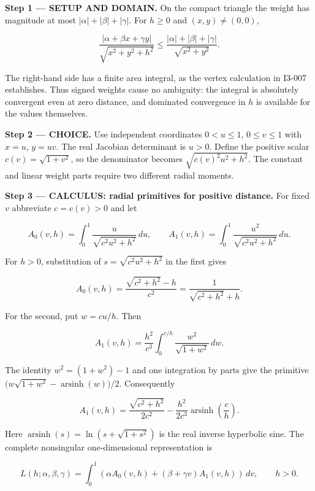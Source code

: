 \documentclass[11pt,oneside,openany]{book}
\begin{document}
\begin{DomainStep}
\textbf{Step 1 --- SETUP AND DOMAIN.} On the compact triangle the weight has magnitude at most \(|\alpha|+|\beta|+|\gamma|\). For \(h\ge0\) and \((x,y)\ne(0,0)\),

\[
\frac{|\alpha+\beta x+\gamma y|}{\sqrt{x^2+y^2+h^2}}
\le\frac{|\alpha|+|\beta|+|\gamma|}{\sqrt{x^2+y^2}}.
\]

The right-hand side has a finite area integral, as the vertex calculation in I3-007 establishes. Thus signed weights cause no ambiguity: the integral is absolutely convergent even at zero distance, and dominated convergence in \(h\) is available for the values themselves.

\end{DomainStep}
\begin{ChoiceStep}
\textbf{Step 2 --- CHOICE.} Use independent coordinates \(0<u\le1\), \(0\le v\le1\) with \(x=u\), \(y=uv\). The real Jacobian determinant is \(u>0\). Define the positive scalar \(c(v)=\sqrt{1+v^2}\), so the denominator becomes \(\sqrt{c(v)^2u^2+h^2}\). The constant and linear weight parts require two different radial moments.

\end{ChoiceStep}
\textbf{Step 3 --- CALCULUS: radial primitives for positive distance.} For fixed \(v\) abbreviate \(c=c(v)>0\) and let

\[
A_0(v,h)=\int_0^1\frac{u}{\sqrt{c^2u^2+h^2}}\,du,
\qquad
A_1(v,h)=\int_0^1\frac{u^2}{\sqrt{c^2u^2+h^2}}\,du.
\]

For \(h>0\), substitution of \(s=\sqrt{c^2u^2+h^2}\) in the first gives

\[
A_0(v,h)=\frac{\sqrt{c^2+h^2}-h}{c^2}
=\frac1{\sqrt{c^2+h^2}+h}.
\]

For the second, put \(w=cu/h\). Then

\[
A_1(v,h)=\frac{h^2}{c^3}\int_0^{c/h}\frac{w^2}{\sqrt{1+w^2}}\,dw.
\]

The identity \(w^2=(1+w^2)-1\) and one integration by parts give the primitive
\(\bigl(w\sqrt{1+w^2}-\operatorname{arsinh}(w)\bigr)/2\). Consequently

\[
A_1(v,h)=\frac{\sqrt{c^2+h^2}}{2c^2}
-\frac{h^2}{2c^3}\operatorname{arsinh}\left(\frac ch\right).
\]

Here \(\operatorname{arsinh}(s)=\ln(s+\sqrt{1+s^2})\) is the real inverse hyperbolic sine. The complete nonsingular one-dimensional representation is

\[
L(h;\alpha,\beta,\gamma)
=\int_0^1\left(\alpha A_0(v,h)+(\beta+\gamma v)A_1(v,h)\right)\,dv,
\qquad h>0.
\]
\end{document}
